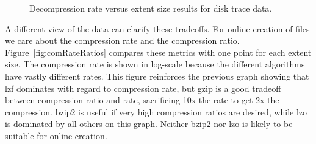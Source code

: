 

\begin{figure}[tbh]
\caption{ Decompression rate versus extent size results for disk trace data.}
\label{fig:decomRates}
\end{figure}

A different view of the data can clarify these tradeoffs.
For online creation of \DataSeries{} files we care about the compression
rate and the compression ratio.
Figure~\ref{fig:comRateRatios} compares these metrics
with one point for each extent size.  The compression rate is shown
in log-scale because the different algorithms have vastly different rates.
This figure reinforces the previous graph showing that lzf dominates
with regard to compression rate, but gzip is a good tradeoff between
compression ratio and rate, sacrificing 10x the rate to get 2x
the compression.  bzip2 is useful if very high compression
ratios are desired, while lzo is dominated by all others on this graph.
Neither bzip2 nor lzo is likely to be suitable for online creation.


